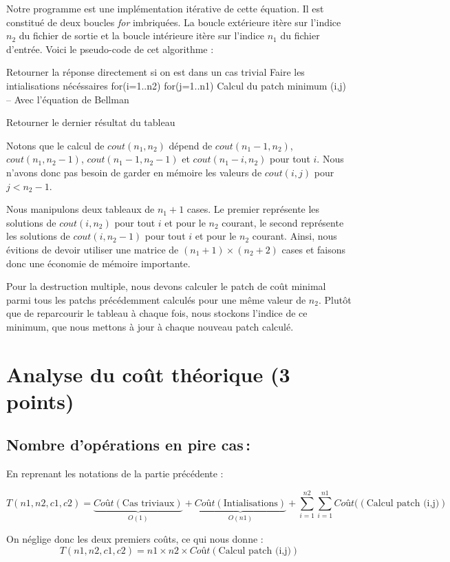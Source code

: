 \documentclass[a4paper, 10pt, french]{article}
\begin{document}
Notre programme est une implémentation itérative de cette équation. Il est constitué
de deux boucles \emph{for} imbriquées. La boucle extérieure itère sur l'indice $n_2$
du fichier de sortie et la boucle intérieure itère sur l'indice $n_1$ du fichier
d'entrée.
Voici le pseudo-code de cet algorithme :
\begin{verbatimtab}
	Retourner la réponse directement si on est dans un cas trivial
	Faire les intialisations nécéssaires
	for(i=1..n2)
	  for(j=1..n1)
		Calcul du patch minimum (i,j) -- Avec l'équation de Bellman

	Retourner le dernier résultat du tableau
\end{verbatimtab}
Notons que le calcul de $cout(n_1, n_2)$ dépend de $cout(n_1-1, n_2)$,
$cout(n_1, n_2-1)$, $cout(n_1-1, n_2-1)$ et $cout(n_1-i, n_2)$ pour tout $i$.
Nous n'avons donc pas besoin de garder en mémoire les valeurs de $cout(i, j)$ pour
$j < n_2-1$.

Nous manipulons deux tableaux de $n_1+1$ cases. Le premier représente les solutions
de $cout(i, n_2)$ pour tout $i$ et pour le $n_2$ courant, le second représente
les solutions de $cout(i, n_2-1)$ pour tout $i$ et pour le $n_2$ courant.
Ainsi, nous évitions de devoir utiliser une matrice de $(n_1+1)\times(n_2+2)$ cases
et faisons donc une économie de mémoire importante.

Pour la destruction multiple, nous devons calculer le patch de coût minimal parmi
tous les patchs précédemment calculés pour une même valeur de $n_2$.
Plutôt que de reparcourir le tableau à chaque fois, nous stockons l'indice de
ce minimum, que nous mettons à jour à chaque nouveau patch calculé.

\section{Analyse du coût théorique (3 points)}

  \subsection{Nombre  d'opérations en pire cas\,:}
    En reprenant les notations de la partie précédente :

    \[T(n1,n2,c1,c2) = \underbrace{Coût(\text{Cas triviaux})}_{O(1)} +
    \underbrace{Coût(\text{Intialisations})}_{O(n1)} +
    \sum_{i=1}^{n2} \sum_{i=1}^{n1} Coût((\text{Calcul patch (i,j)})\]

	On néglige donc les deux premiers coûts, ce qui nous donne :
	\[T(n1,n2,c1,c2) = n1 \times n2 \times Coût(\text{Calcul patch (i,j)})\]
\end{document}
